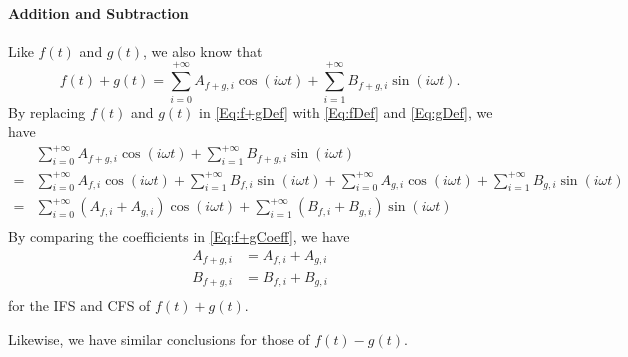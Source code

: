 \documentclass[12pt]{article}
\begin{document}
\paragraph{Addition and Subtraction}\label{App-Para:Addition&Subtraction}
Like $f(t)$ and $g(t)$, we also know that 
\begin{equation}\label{Eq:f+gDef}
	f(t)+g(t)=\sum_{i=0}^{+\infty}A_{f+g, i}
	\cos(i\omega t)+\sum_{i=1}^{+\infty}B_{f+g, i}\sin(i\omega t).
\end{equation} 
By replacing $f(t)$ and $g(t)$ in \autoref{Eq:f+gDef} 
with \autoref{Eq:fDef} and \autoref{Eq:gDef}, we have
\begin{equation}\label{Eq:f+gCoeff}
	\begin{aligned}
	&\sum_{i=0}^{+\infty}A_{f+g, i}\cos(i\omega t)
	+\sum_{i=1}^{+\infty}B_{f+g, i}\sin(i\omega t)\\
	=&\sum_{i=0}^{+\infty}A_{f, i}\cos(i\omega t)+\sum_{i=1}^{+\infty}
	B_{f, i}\sin(i\omega t)+\sum_{i=0}^{+\infty}A_{g, i}\cos(i\omega t)
	+\sum_{i=1}^{+\infty}B_{g, i}\sin(i\omega t)\\
	=&\sum_{i=0}^{+\infty}(A_{f, i}+A_{g,i})\cos(i\omega t)
	+\sum_{i=1}^{+\infty}(B_{f, i}+B_{g, i})\sin(i\omega t)\\
	\end{aligned}
\end{equation}
By comparing the coefficients in \autoref{Eq:f+gCoeff}, we have
\begin{equation}\label{Eq:f+gConclusion}
	\begin{aligned}
	A_{f+g, i}&=A_{f,i}+A_{g, i}\\
	B_{f+g, i}&=B_{f,i}+B_{g, i}\\
	\end{aligned}
\end{equation}
for the IFS and CFS of $f(t)+g(t)$.

Likewise, we have similar conclusions for those of $f(t)-g(t)$.
\end{document}

